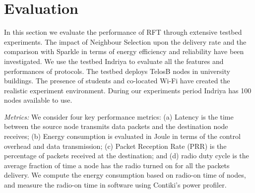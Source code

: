 \documentclass[conference]{IEEEtran}
\begin{document}

\section{Evaluation}
\label{evaluation}
In this section we evaluate the performance of RFT through extensive testbed experiments. The impact of Neighbour Selection upon the delivery rate and the comparison with Sparkle in terms of energy efficiency and reliability have been investigated. We use the testbed Indriya \cite{doddavenkatappa2012indriya} to evaluate all the features and performances of protocols. The testbed deploys TelosB nodes in university buildings. The presence of students and co-located Wi-Fi have created the realistic experiment environment. During our experiments period Indriya has 100 nodes available to use. 
 
\emph{Metrics:}
We consider four key performance metrics: (a) Latency is the time between the source node transmits data packets and the destination node receives; (b) Energy consumption is evaluated in Joule in terms of the control overhead and data transmission; (c) Packet Reception Rate (PRR) is the percentage of packets received at the destination; and (d) radio duty cycle is the average fraction of time a node has the radio turned on for all the packets delivery. We compute the energy consumption based on radio-on time of nodes, and measure the radio-on time in software using Contiki's power profiler.
\end{document}
